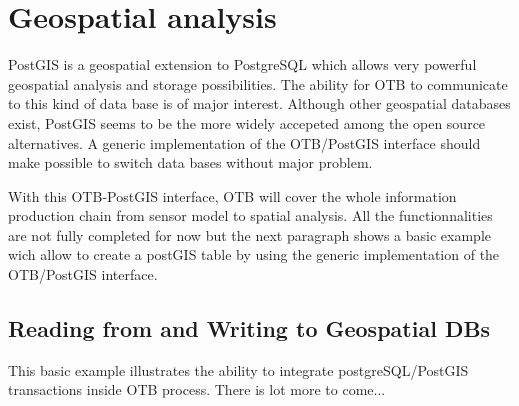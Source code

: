 
\chapter{Geospatial analysis}\label{sec:GeospatialAnalysis}

PostGIS is a geospatial extension to PostgreSQL which allows very powerful 
geospatial analysis and storage possibilities. The ability for OTB to 
communicate to this kind of data base is of major interest.
Although other geospatial databases exist, PostGIS seems to be the 
more widely accepeted among the open source alternatives. A generic 
implementation of the OTB/PostGIS interface should make possible to 
switch data bases without major problem.

With this OTB-PostGIS interface, OTB will cover the whole information 
production chain from sensor model to spatial analysis.
All the functionnalities are not fully completed for now but the next 
paragraph shows a basic example wich allow to create a postGIS table
by using the generic implementation of the OTB/PostGIS interface.
  
\section{Reading from and Writing to Geospatial DBs}\label{sec:PostGISCreateTable}


This basic example illustrates the ability to integrate postgreSQL/PostGIS transactions
inside OTB process.
There is lot more to come...






